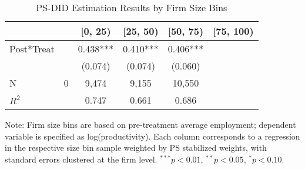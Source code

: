 \begin{table}[!htbp]\centering
\caption{PS-DID Estimation Results by Firm Size Bins}
\label{tab:psm_did_by_size_impute}
\begin{threeparttable}
\begin{tabular}{l*{4}{c}} 
\toprule
 &  & [0, 25) & [25, 50) & [50, 75) & [75, 100) \\
\midrule
Post*Treat &  & 0.438*** & 0.410*** & 0.406*** \\
           &  & (0.074) & (0.074) & (0.060) \\
\midrule
N          & 0 & 9,474 & 9,155 & 10,550 \\
$R^2$      &  & 0.747 & 0.661 & 0.686 \\
\bottomrule
\end{tabular}
\begin{tablenotes}[flushleft]
\footnotesize
\item Note: Firm size bins are based on pre-treatment average employment; dependent variable is specified as log(productivity). Each column corresponds to a regression in the respective size bin sample weighted by PS stabilized weights, with standard errors clustered at the firm level. $^{***}p<0.01$, $^{**}p<0.05$, $^{*}p<0.10$.
\end{tablenotes}
\end{threeparttable}
\end{table}